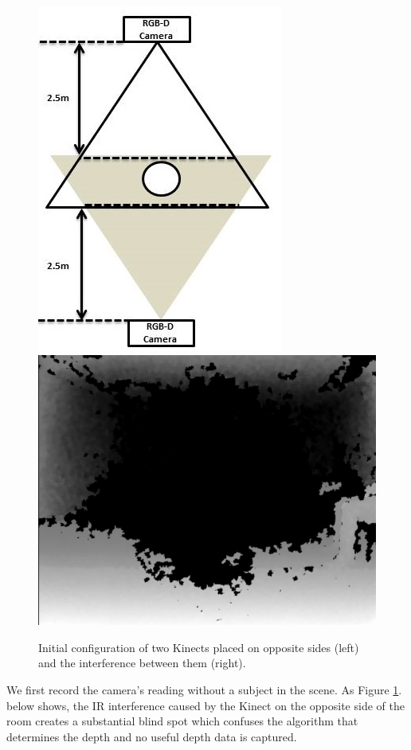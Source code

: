 \documentclass[10pt,a4paper]{article}
\begin{document}
\begin{figure}[H]
\centering
\includegraphics[scale=0.4]{figure_2cameras_opposite.jpg}
\includegraphics[scale=0.16]{IR_Interference2.jpg}
\caption{Initial configuration of two Kinects placed on opposite sides (left) and the interference between them (right).}
\label{2_cameras_config1}
\end{figure}

\noindent
We first record the camera's reading without a subject in the scene. As Figure \ref{2_cameras_config1}. below shows, the IR interference caused by the Kinect on the opposite side of the room creates a substantial blind spot which confuses the algorithm that determines the depth and no useful depth data is captured.
 
\end{document}
